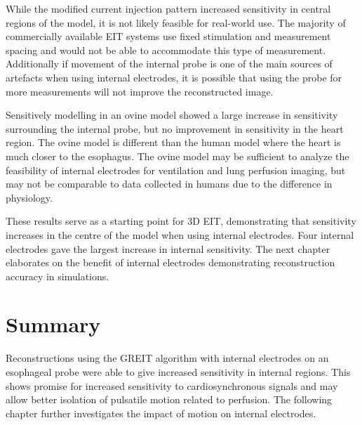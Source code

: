 While the modified current injection pattern increased sensitivity in central
regions of the model, it is not likely feasible for real-world use. 
The majority of commercially available EIT systems use fixed  stimulation and measurement spacing
and would not be able to accommodate this type of measurement. 
Additionally if movement of the internal probe is one of the main sources of artefacts when 
using internal electrodes, it is possible that using the probe for 
more measurements will not improve the reconstructed image.

Sensitively modelling in an ovine model showed a large 
increase in sensitivity surrounding the
internal probe, but no improvement in sensitivity in the heart region.
The ovine model is different than the human model where 
the heart is much closer to the esophagus. The ovine model may be sufficient 
to analyze the feasibility of internal electrodes for ventilation and lung perfusion imaging, 
but may not be comparable to data collected in humans due to the difference in 
physiology. 

These results serve as a starting point for 3D EIT, demonstrating 
that sensitivity increases  
in the centre of the model when using internal electrodes. 
Four internal electrodes gave the largest increase in internal sensitivity.
The next chapter elaborates on the benefit of internal electrodes
demonstrating reconstruction accuracy in simulations. 

\section{Summary}
Reconstructions using the GREIT algorithm
with internal electrodes on 
an esophageal probe were able to give increased
sensitivity in internal regions. This shows promise for increased 
sensitivity to cardiosynchronous signals 
and may allow better isolation of pulsatile 
motion related to perfusion. 
The following chapter further investigates the impact of motion on internal 
electrodes.
